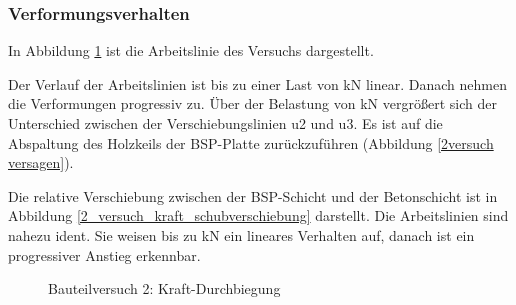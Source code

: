 \subsubsection{Verformungsverhalten}


In Abbildung \ref{2 Versuch: Kraft-Durchbiegung} ist die Arbeitslinie des Versuchs dargestellt.


Der Verlauf der Arbeitslinien ist bis zu einer Last von \unit[14]{kN} linear. Danach nehmen die Verformungen progressiv zu. Über der Belastung von \unit[16]{kN} vergrößert sich der Unterschied zwischen der Verschiebungslinien u2 und u3. Es ist auf die Abspaltung des Holzkeils der BSP-Platte zurückzuführen (Abbildung \ref{2versuch versagen}). 
 

Die relative Verschiebung zwischen der BSP-Schicht und der Betonschicht ist in Abbildung \ref{2_versuch_kraft_schubverschiebung} darstellt. Die Arbeitslinien sind nahezu ident. Sie weisen bis zu \unit[15]{kN} ein lineares Verhalten auf, danach ist ein progressiver Anstieg erkennbar.


\begin{figure}[h!]
\begin{center}
\caption{Bauteilversuch 2: Kraft-Durchbiegung}
\label{2 Versuch: Kraft-Durchbiegung}
\end{center}
\end{figure}





